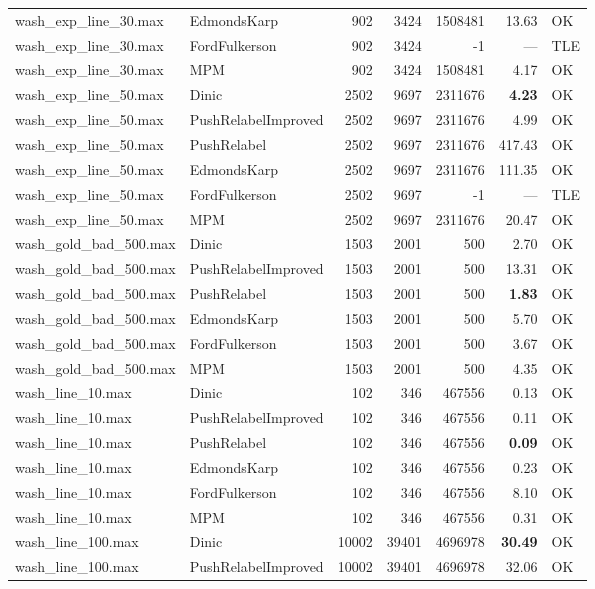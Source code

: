 \begin{longtable}{llrrrrl}
wash\_exp\_line\_30.max & EdmondsKarp & 902 & 3424 & 1508481 & 13.63 & OK \\
wash\_exp\_line\_30.max & FordFulkerson & 902 & 3424 & -1 & --- & TLE \\
wash\_exp\_line\_30.max & MPM & 902 & 3424 & 1508481 & 4.17 & OK \\
\midrule
wash\_exp\_line\_50.max & Dinic & 2502 & 9697 & 2311676 & \textbf{4.23} & OK \\
wash\_exp\_line\_50.max & PushRelabelImproved & 2502 & 9697 & 2311676 & 4.99 & OK \\
wash\_exp\_line\_50.max & PushRelabel & 2502 & 9697 & 2311676 & 417.43 & OK \\
wash\_exp\_line\_50.max & EdmondsKarp & 2502 & 9697 & 2311676 & 111.35 & OK \\
wash\_exp\_line\_50.max & FordFulkerson & 2502 & 9697 & -1 & --- & TLE \\
wash\_exp\_line\_50.max & MPM & 2502 & 9697 & 2311676 & 20.47 & OK \\
\midrule
wash\_gold\_bad\_500.max & Dinic & 1503 & 2001 & 500 & 2.70 & OK \\
wash\_gold\_bad\_500.max & PushRelabelImproved & 1503 & 2001 & 500 & 13.31 & OK \\
wash\_gold\_bad\_500.max & PushRelabel & 1503 & 2001 & 500 & \textbf{1.83} & OK \\
wash\_gold\_bad\_500.max & EdmondsKarp & 1503 & 2001 & 500 & 5.70 & OK \\
wash\_gold\_bad\_500.max & FordFulkerson & 1503 & 2001 & 500 & 3.67 & OK \\
wash\_gold\_bad\_500.max & MPM & 1503 & 2001 & 500 & 4.35 & OK \\
\midrule
wash\_line\_10.max & Dinic & 102 & 346 & 467556 & 0.13 & OK \\
wash\_line\_10.max & PushRelabelImproved & 102 & 346 & 467556 & 0.11 & OK \\
wash\_line\_10.max & PushRelabel & 102 & 346 & 467556 & \textbf{0.09} & OK \\
wash\_line\_10.max & EdmondsKarp & 102 & 346 & 467556 & 0.23 & OK \\
wash\_line\_10.max & FordFulkerson & 102 & 346 & 467556 & 8.10 & OK \\
wash\_line\_10.max & MPM & 102 & 346 & 467556 & 0.31 & OK \\
\midrule
wash\_line\_100.max & Dinic & 10002 & 39401 & 4696978 & \textbf{30.49} & OK \\
wash\_line\_100.max & PushRelabelImproved & 10002 & 39401 & 4696978 & 32.06 & OK \\

\end{longtable}
